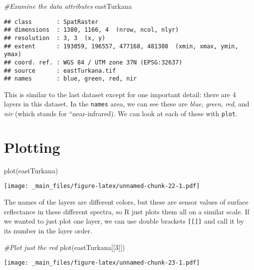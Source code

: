 \documentclass[
]{book}
\newenvironment{Shaded}{\begin{snugshade}}{\end{snugshade}}
\newcommand{\CommentTok}[1]{\textcolor[rgb]{0.56,0.35,0.01}{\textit{#1}}}
\newcommand{\DecValTok}[1]{\textcolor[rgb]{0.00,0.00,0.81}{#1}}
\newcommand{\FunctionTok}[1]{\textcolor[rgb]{0.00,0.00,0.00}{#1}}
\newcommand{\NormalTok}[1]{#1}
\begin{document}
\begin{Shaded}
\begin{Highlighting}[]
\CommentTok{\#Examine the data attributes}
\NormalTok{eastTurkana}
\end{Highlighting}
\end{Shaded}

\begin{verbatim}
## class       : SpatRaster 
## dimensions  : 1380, 1166, 4  (nrow, ncol, nlyr)
## resolution  : 3, 3  (x, y)
## extent      : 193059, 196557, 477168, 481308  (xmin, xmax, ymin, ymax)
## coord. ref. : WGS 84 / UTM zone 37N (EPSG:32637) 
## source      : eastTurkana.tif 
## names       : blue, green, red, nir
\end{verbatim}

This is similar to the last dataset except for one important detail: there are 4 layers in this dataset. In the \texttt{names} area, we can see these are \emph{blue}, \emph{green}, \emph{red}, and \emph{nir} (which stands for ``near-infrared). We can look at each of these with \texttt{plot}.

\hypertarget{plotting}{%
\section{Plotting}\label{plotting}}

\begin{Shaded}
\begin{Highlighting}[]
\FunctionTok{plot}\NormalTok{(eastTurkana)}
\end{Highlighting}
\end{Shaded}

\texttt{[image: \_main\_files/figure-latex/unnamed-chunk-22-1.pdf]}

The names of the layers are different colors, but these are sensor values of surface reflectance in these different spectra, so R just plots them all on a similar scale. If we wanted to just plot one layer, we can use double brackets \texttt{{[}{[}{]}{]}} and call it by its number in the layer order.

\begin{Shaded}
\begin{Highlighting}[]
\CommentTok{\#Plot just the red}
\FunctionTok{plot}\NormalTok{(eastTurkana[[}\DecValTok{3}\NormalTok{]])}
\end{Highlighting}
\end{Shaded}

\texttt{[image: \_main\_files/figure-latex/unnamed-chunk-23-1.pdf]}
\end{document}
